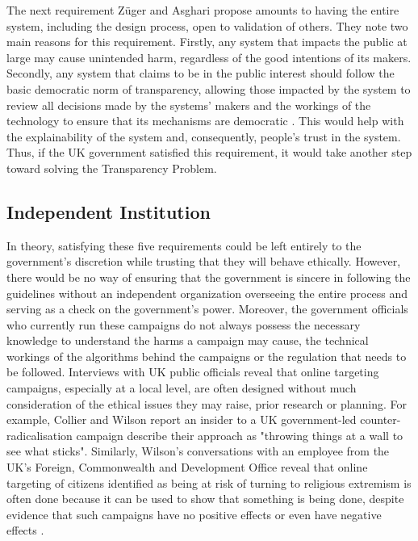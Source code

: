 \documentclass[preprint]{acmart}
\begin{document}
The next requirement Züger and Asghari \cite{zuger2022} propose amounts to having the entire system, including the design process, open to validation of others. They note two main reasons for this requirement. Firstly, any system that impacts the public at large may cause unintended harm, regardless of the good intentions of its makers. Secondly, any system that claims to be in the public interest should follow the basic democratic norm of transparency, allowing those impacted by the system to review all decisions made by the systems' makers and the workings of the technology to ensure that its mechanisms are democratic \cite{zuger2022}. This would help with the explainability of the system and, consequently, people's trust in the system. Thus, if the UK government satisfied this requirement, it would take another step toward solving the Transparency Problem. 


\subsection{Independent Institution}

In theory, satisfying these five requirements could be left entirely to the government's discretion while trusting that they will behave ethically. However, there would be no way of ensuring that the government is sincere in following the guidelines without an independent organization overseeing the entire process and serving as a check on the government's power. Moreover, the government officials who currently run these campaigns do not always possess the necessary knowledge to understand the harms a campaign may cause, the technical workings of the algorithms behind the campaigns or the regulation that needs to be followed. Interviews with UK public officials reveal that online targeting campaigns, especially at a local level, are often designed without much consideration of the ethical issues they may raise, prior research or planning. For example, Collier and Wilson \cite{collierwilson} report an insider to a UK government-led counter-radicalisation campaign describe their approach as "throwing things at a wall to see what sticks". Similarly, Wilson's conversations with an employee from the UK's Foreign, Commonwealth and Development Office reveal that online targeting of citizens identified as being at risk of turning to religious extremism is often done because it can be used to show that something is being done, despite evidence that such campaigns have no positive effects or even have negative effects \cite{wilson}.
\end{document}

